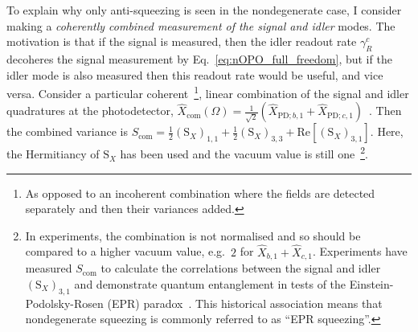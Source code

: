 To explain why only anti-squeezing is seen in the nondegenerate case, I consider making a \emph{coherently combined measurement of the signal and idler} modes. The motivation is that if the signal is measured, then the idler readout rate $\gamma^c_R$ decoheres the signal measurement by Eq.~\ref{eq:nOPO_full_freedom}, but if the idler mode is also measured then this readout rate would be useful, and vice versa. Consider a particular coherent~\footnote{As opposed to an incoherent combination where the fields are detected separately and then their variances added.}, linear combination of the signal and idler quadratures at the photodetector,  
$\hat X_\text{com}(\Omega)=\frac{1}{\sqrt{2}}(\hat X_{\text{PD};b,1}+\hat X_{\text{PD};c,1})$~\cite{schoriNarrowbandFrequencyTunable2002}.
Then the combined variance is %
$S_\text{com}=\frac{1}{2}(\text{S}_X)_{1,1}+\frac{1}{2}(\text{S}_X)_{3,3}+\text{Re}[(\text{S}_X)_{3,1}]$.
Here, the Hermitiancy of $\text{S}_X$ has been used and the vacuum value is still one~\footnote{In experiments, the combination is not normalised and so should be compared to a higher vacuum value, e.g.\ $2$ for $\hat X_{b,1} + \hat X_{c,1}$. Experiments have measured $S_\text{com}$ to calculate the correlations between the signal and idler $(\text{S}_X)_{3,1}$ and demonstrate quantum entanglement in tests of the Einstein-Podolsky-Rosen (EPR) paradox~\cite{PhysRev.47.777,reidDemonstrationEinsteinPodolskyRosenParadox1989,schoriNarrowbandFrequencyTunable2002}. This historical association means that nondegenerate squeezing is commonly referred to as ``EPR squeezing''.}. 
